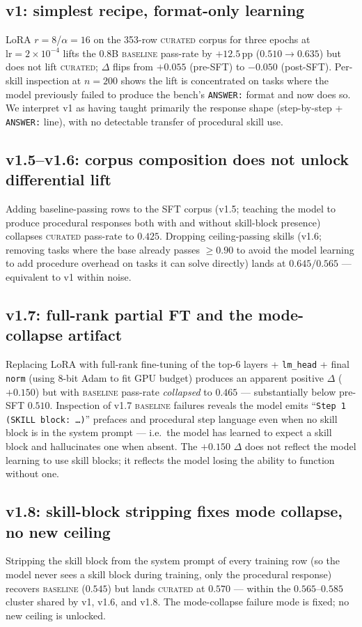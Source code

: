 \documentclass[10pt]{article}
\newcommand{\BL}{\textsc{baseline}\xspace}
\newcommand{\CU}{\textsc{curated}\xspace}
\begin{document}
\subsection{v1: simplest recipe, format-only learning}
LoRA $r{=}8$/$\alpha{=}16$ on the 353-row \CU{} corpus for three epochs at $\mathrm{lr}{=}2{\times}10^{-4}$ lifts the 0.8B \BL{} pass-rate by $+12.5$\,pp ($0.510 \to 0.635$) but does not lift \CU; $\Delta$ flips from $+0.055$ (pre-SFT) to $-0.050$ (post-SFT). Per-skill inspection at $n{=}200$ shows the lift is concentrated on tasks where the model previously failed to produce the bench's \texttt{ANSWER:} format and now does so. We interpret v1 as having taught primarily the response shape (step-by-step + \texttt{ANSWER:} line), with no detectable transfer of procedural skill use.

\subsection{v1.5--v1.6: corpus composition does not unlock differential lift}
Adding baseline-passing rows to the SFT corpus (v1.5; teaching the model to produce procedural responses both with and without skill-block presence) collapses \CU{} pass-rate to $0.425$. Dropping ceiling-passing skills (v1.6; removing tasks where the base already passes $\geq\!0.90$ to avoid the model learning to add procedure overhead on tasks it can solve directly) lands at $0.645/0.565$ --- equivalent to v1 within noise.

\subsection{v1.7: full-rank partial FT and the mode-collapse artifact}\label{sec:v17-mode-collapse}
Replacing LoRA with full-rank fine-tuning of the top-6 layers + \texttt{lm\_head} + final \texttt{norm} (using 8-bit Adam to fit GPU budget) produces an apparent positive $\Delta$ ($+0.150$) but with \BL{} pass-rate \emph{collapsed} to $0.465$ --- substantially below pre-SFT $0.510$. Inspection of v1.7 \BL{} failures reveals the model emits ``\texttt{Step 1 (SKILL block: \dots)}'' prefaces and procedural step language even when no skill block is in the system prompt --- i.e.\ the model has learned to expect a skill block and hallucinates one when absent. The $+0.150$ $\Delta$ does not reflect the model learning to use skill blocks; it reflects the model losing the ability to function without one.

\subsection{v1.8: skill-block stripping fixes mode collapse, no new ceiling}
Stripping the skill block from the system prompt of every training row (so the model never sees a skill block during training, only the procedural response) recovers \BL{} ($0.545$) but lands \CU{} at $0.570$ --- within the $0.565$--$0.585$ cluster shared by v1, v1.6, and v1.8. The mode-collapse failure mode is fixed; no new ceiling is unlocked.
\end{document}
